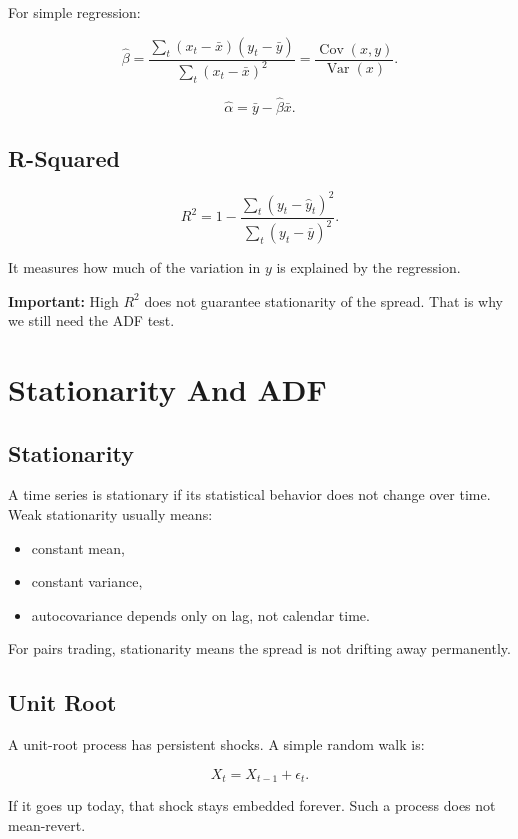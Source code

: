 \documentclass[11pt]{article}
\newcommand{\Var}{\operatorname{Var}}
\newcommand{\Cov}{\operatorname{Cov}}
\begin{document}
For simple regression:

\[
\hat{\beta}
= \frac{\sum_t (x_t - \bar{x})(y_t - \bar{y})}
{\sum_t (x_t - \bar{x})^2}
= \frac{\Cov(x,y)}{\Var(x)}.
\]

\[
\hat{\alpha} = \bar{y} - \hat{\beta}\bar{x}.
\]

\subsection{R-Squared}

\[
R^2 = 1 - \frac{\sum_t (y_t-\hat{y}_t)^2}
{\sum_t (y_t-\bar{y})^2}.
\]

It measures how much of the variation in $y$ is explained by the regression.

\textbf{Important:} High $R^2$ does not guarantee stationarity of the spread.
That is why we still need the ADF test.

\section{Stationarity And ADF}

\subsection{Stationarity}

A time series is stationary if its statistical behavior does not change over
time. Weak stationarity usually means:

\begin{itemize}
  \item constant mean,
  \item constant variance,
  \item autocovariance depends only on lag, not calendar time.
\end{itemize}

For pairs trading, stationarity means the spread is not drifting away
permanently.

\subsection{Unit Root}

A unit-root process has persistent shocks. A simple random walk is:

\[
X_t = X_{t-1} + \epsilon_t.
\]

If it goes up today, that shock stays embedded forever. Such a process does not
mean-revert.
\end{document}
